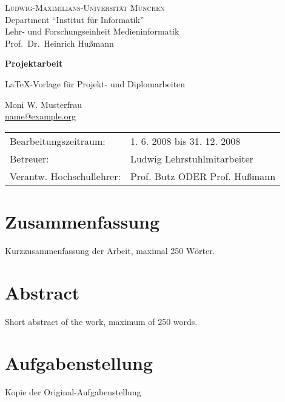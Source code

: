 \documentclass[11pt,a4paper,twoside]{article}
\begin{document}
\pagestyle{empty} %

\begin{center}
\textsc{Ludwig-Maximilians-Universität München}\\
Department ``Institut für Informatik''\\
Lehr- und Forschungseinheit Medieninformatik\\
Prof.\ Dr.\ Heinrich Hußmann

\vspace{5cm}
{\large\textbf{Projektarbeit}}\vspace{.5cm}

{\LARGE \LaTeX-Vorlage für Projekt- und Diplomarbeiten}\vspace{1cm}

{\large Moni W. Musterfrau}\\\href{mailto:name@example.org}{name@example.org}

\end{center}
\vfill

\begin{tabular}{ll}
Bearbeitungszeitraum: & 1. 6. 2008 bis 31. 12. 2008\\
Betreuer: & Ludwig Lehrstuhlmitarbeiter\\
Verantw. Hochschullehrer: & Prof. Butz ODER Prof. Hußmann
\end{tabular}

\clearpage
\section*{Zusammenfassung}

Kurzzusammenfassung der Arbeit, maximal 250 Wörter.

\section*{Abstract}

Short abstract of the work, maximum of 250 words.

\clearpage
\section*{Aufgabenstellung}

Kopie der Original-Aufgabenstellung
\end{document}
